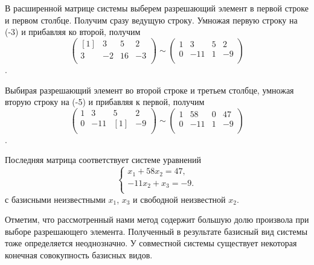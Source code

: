 \documentclass{article}
\begin{document}
В расширенной матрице системы выберем разрешающий элемент в первой строке и первом столбце. Получим сразу ведущую строку. Умножая первую строку на (-3) и прибавляя ко второй, получим
$$\left(\begin{array}{rrr|r} 
[1]\!&3&5&2\\
3&-2&16&-3\\
\end{array}\right) 
\sim \left(\begin{array}{rrr|r} 
1&3&5&2\\
0&-11&1&-9\\
\end{array}\right)$$.

Выбирая разрешающий элемент во второй строке и третьем столбце, умножая вторую строку на (-5) и прибавляя к первой, получим
$$\left(\begin{array}{rrr|r} 
1&3&5&2\\
0&-11&[1]\!&-9\\
\end{array}\right) 
\sim \left(\begin{array}{rrr|r} 
1&58&0&47\\
0&-11&1&-9\\
\end{array}\right)$$.

Последняя матрица соответствует системе уравнений
\begin{equation*}
\begin{cases}
x_1+ 58x_2 = 47,\\
-11x_2+ x_3 = -9.\\
\end{cases}
\end{equation*}
с базисными неизвестными $x_1$, $x_3$ и свободной неизвестной $x_2$.

Отметим, что рассмотренный нами метод содержит большую долю произвола при выборе разрешающего элемента. Полученный в результате базисный вид системы тоже определяется неоднозначно. У совместной системы существует некоторая конечная совокупность базисных видов.
\end{document}
